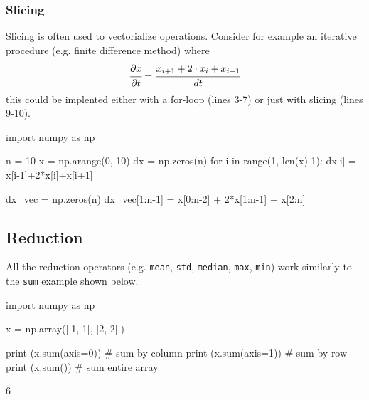 \subsubsection{Slicing}
Slicing is often used to vectorialize operations. Consider for example an iterative procedure (e.g. finite difference method) where 
$$
\cfrac{\partial x}{\partial t} = \cfrac{x_{i+1} + 2\cdot x_i + x_{i-1}}{dt}
$$
this could be implented either with a for-loop (lines 3-7) or just with slicing (lines 9-10). 

\begin{ipython}
import numpy as np

n = 10
x = np.arange(0, 10)
dx = np.zeros(n)
for i in range(1, len(x)-1):
  dx[i] = x[i-1]+2*x[i]+x[i+1]

dx_vec = np.zeros(n)
dx_vec[1:n-1] = x[0:n-2] + 2*x[1:n-1] + x[2:n]
\end{ipython}

\subsection{Reduction}

All the reduction operators (e.g. \texttt{mean}, \texttt{std}, \texttt{median}, \texttt{max}, \texttt{min}) work similarly to the \texttt{sum} example shown below.

\begin{ipythonnon}
import numpy as np

x = np.array([[1, 1], [2, 2]])

print (x.sum(axis=0)) # sum by column
print (x.sum(axis=1)) # sum by row
print (x.sum())       # sum entire array
\end{ipythonnon}
\begin{ioutput}
[3 3]
[2 4]
6
\end{ioutput}